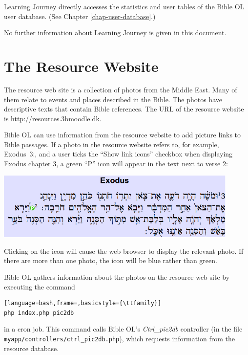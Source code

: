 \documentclass[11pt,oneside,a4paper]{memoir}
\newcommand*{\bibleref}[3]{#1~#2\thinspace:\thinspace#3}
\begin{document}
Learning Journey directly accesses the statistics and user tables of the Bible OL user database. (See
Chapter \ref{chap-user-database}.)

No further information about Learning Journey is given in this document.


\section{The Resource Website}\label{sec-resource-web}

The resource web site is a collection of photos from the Middle East. Many of them relate to events
and places described in the Bible. The photos have descriptive texts that contain Bible references.
The URL of the resource website is \url{http://resources.3bmoodle.dk}.

Bible OL can use information from the resource website to add picture links to Bible passages. If a
photo in the resource website refers to, for example, \bibleref{Exodus}{3}{2}, and a user ticks the
``Show link icons'' checkbox when displaying Exodus chapter 3, a green ``P'' icon will appear in the
text next to verse 2:

\begin{center}
\includegraphics[width=0.9\textwidth]{exodus3.png}
\end{center}

Clicking on the icon will cause the web browser to display the relevant photo. If there are more
than one photo, the icon will be blue rather than green.

Bible OL gathers information about the photos on the resource web site by executing the command

\begin{lstlisting}[language=bash,frame=,basicstyle={\ttfamily}]
php index.php pic2db
\end{lstlisting}

\noindent
in a cron job. This command calls Bible OL's \emph{Ctrl\_pic2db} controller (in the file
\texttt{myapp/\allowbreak{}controllers/\allowbreak{}ctrl\_pic2db.php}), which requests information from the resource database.
\end{document}
